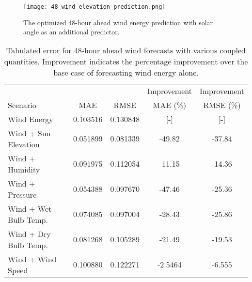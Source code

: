 \begin{figure*}[!ht]
  \centering
  \texttt{[image: 48\_wind\_elevation\_prediction.png]}
  \caption{The optimized 48-hour ahead wind energy prediction with solar angle as an additional predictor.}
  \label{fig:wind48}
\end{figure*}
  \begin{table*}[!ht]
    \centering
    \caption{Tabulated error for 48-hour ahead wind forecasts with various coupled quantities. Improvement indicates the percentage improvement over the base case of forecasting wind energy alone.}
    \label{tab:wind48}
    \begin{tabular}{l|c|c|c|c}
      &  & & Improvement & Improvement \\
      Scenario  & MAE & RMSE & MAE (\%) & RMSE (\%)\\
      \hline
      Wind Energy & 0.103516 & 0.130848 & [-] & [-] \\
      Wind + Sun Elevation & 0.051899 & 0.081339 & -49.82 & -37.84\\
      Wind + Humidity & 0.091975 & 0.112054 & -11.15 & -14.36\\
      Wind + Pressure & 0.054388 & 0.097670 & -47.46 & -25.36\\
      Wind + Wet Bulb Temp. & 0.074085 & 0.097004 & -28.43 & -25.86\\
      Wind + Dry Bulb Temp. & 0.081268 & 0.105289 & -21.49 & -19.53\\
      Wind + Wind Speed & 0.100880 & 0.122271 & -2.5464 &-6.555 \\
    \end{tabular}
  \end{table*}
